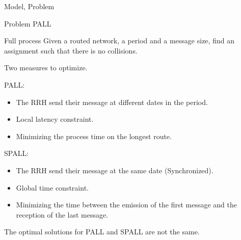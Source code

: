 \documentclass[10 pt]{beamer}
\begin{document}
\begin{section}{Model, Problem}
\begin{subsection}{Problem PALL}
\begin{frame}{Full process}
Given a routed network, a period and a message size, find an assignment such that there is no collisions.
\end {frame}
\begin{frame}
Two measures to optimize.
 \begin{multicols}{2}
PALL:
\begin{itemize}
\item The RRH send their message at different dates in the period.
\item Local latency constraint.
\item Minimizing the process time on the longest route.
\end{itemize}
\vspace{0.5cm}
SPALL:
\begin{itemize}
\item The RRH send their message at the same date (Synchronized).
\item Global time constraint.
\item Minimizing the time between the emission of the first message and the reception of the last message.
\end{itemize}
\end{multicols}

The optimal solutions for PALL and SPALL are not the same.
\end{frame}
\end{subsection}


\end{section}
\end{document}
